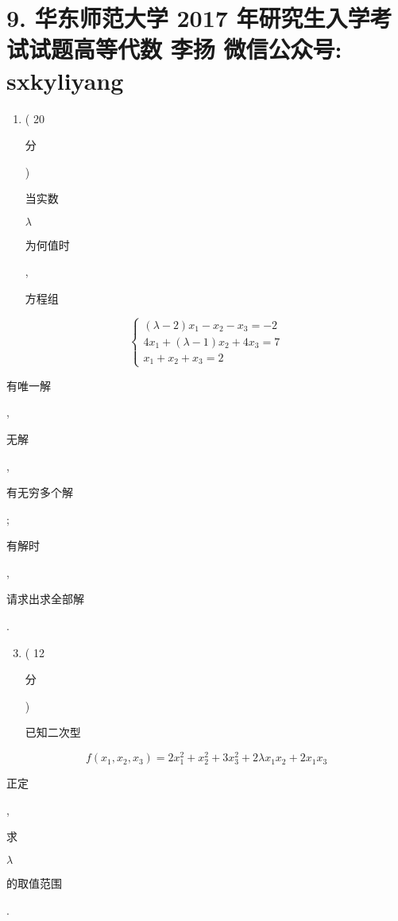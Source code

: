 \documentclass[10pt]{article}
\begin{document}
\section{9. 华东师范大学 2017 年研究生入学考试试题高等代数 
 李扬 
 微信公众号: sxkyliyang}
\begin{enumerate}
  \item ( 20 \begin{CJK}{UTF8}{mj}分\end{CJK}) \begin{CJK}{UTF8}{mj}当实数\end{CJK} $\lambda$ \begin{CJK}{UTF8}{mj}为何值时\end{CJK}, \begin{CJK}{UTF8}{mj}方程组\end{CJK}
\end{enumerate}
$$
\left\{\begin{array}{l}
(\lambda-2) x_{1}-x_{2}-x_{3}=-2 \\
4 x_{1}+(\lambda-1) x_{2}+4 x_{3}=7 \\
x_{1}+x_{2}+x_{3}=2
\end{array}\right.
$$
\begin{CJK}{UTF8}{mj}有唯一解\end{CJK}, \begin{CJK}{UTF8}{mj}无解\end{CJK}, \begin{CJK}{UTF8}{mj}有无穷多个解\end{CJK}; \begin{CJK}{UTF8}{mj}有解时\end{CJK}, \begin{CJK}{UTF8}{mj}请求出求全部解\end{CJK}.

\begin{enumerate}
  \setcounter{enumi}{2}
  \item ( 12 \begin{CJK}{UTF8}{mj}分\end{CJK}) \begin{CJK}{UTF8}{mj}已知二次型\end{CJK}
\end{enumerate}
$$
f\left(x_{1}, x_{2}, x_{3}\right)=2 x_{1}^{2}+x_{2}^{2}+3 x_{3}^{2}+2 \lambda x_{1} x_{2}+2 x_{1} x_{3}
$$
\begin{CJK}{UTF8}{mj}正定\end{CJK}, \begin{CJK}{UTF8}{mj}求\end{CJK} $\lambda$ \begin{CJK}{UTF8}{mj}的取值范围\end{CJK}.
\end{document}
